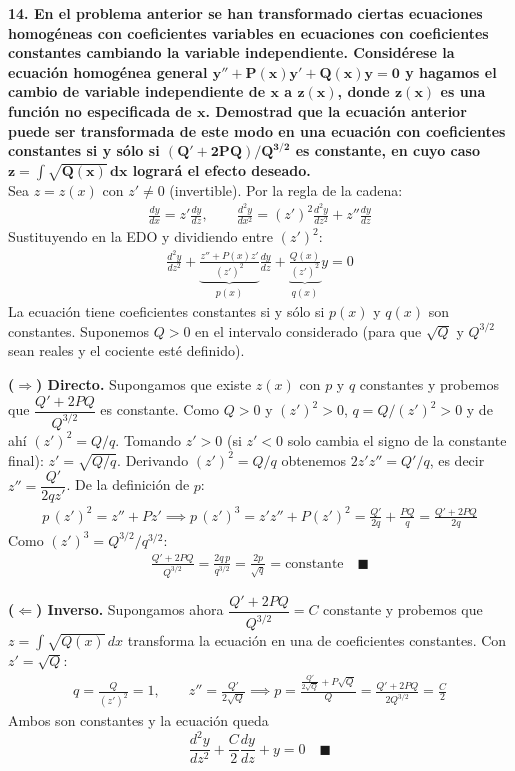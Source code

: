 \documentclass[11pt, a4paper]{article}
\begin{document}
\noindent\textbf{14. En el problema anterior se han transformado ciertas ecuaciones homogéneas con coeficientes variables en ecuaciones con coeficientes constantes cambiando la variable independiente. Considérese la ecuación homogénea general $\bm{y''+P(x)y'+Q(x)y=0}$ y hagamos el cambio de variable independiente de $\bm{x}$ a $\bm{z(x)}$, donde $\bm{z(x)}$ es una función no especificada de $\bm{x}$. Demostrad que la ecuación anterior puede ser transformada de este modo en una ecuación con coeficientes constantes si y sólo si $\bm{(Q'+2PQ)/Q^{3/2}}$ es constante, en cuyo caso $\bm{z=\int\sqrt{Q(x)}\,dx}$ logrará el efecto deseado.} \\
Sea $z=z(x)$ con $z'\neq0$ (invertible). Por la regla de la cadena:
\begin{align*}
\frac{dy}{dx} = z' \frac{dy}{dz}, \qquad \frac{d^2y}{dx^2} = (z')^2 \frac{d^2y}{dz^2} + z'' \frac{dy}{dz}
\end{align*}
Sustituyendo en la EDO y dividiendo entre $(z')^2$:
\begin{align*}
\frac{d^2y}{dz^2} + \underbrace{\frac{z'' + P(x)z'}{(z')^2}}_{p(x)} \frac{dy}{dz} + \underbrace{\frac{Q(x)}{(z')^2}}_{q(x)} y = 0
\end{align*}
La ecuación tiene coeficientes constantes si y sólo si $p(x)$ y $q(x)$ son constantes. Suponemos $Q>0$ en el intervalo considerado (para que $\sqrt{Q}$ y $Q^{3/2}$ sean reales y el cociente esté definido).

\vspace{0.2cm}\noindent\textbf{($\Rightarrow$) Directo.} Supongamos que existe $z(x)$ con $p$ y $q$ constantes y probemos que $\dfrac{Q'+2PQ}{Q^{3/2}}$ es constante. Como $Q>0$ y $(z')^2>0$, $q=Q/(z')^2>0$ y de ahí $(z')^2=Q/q$. Tomando $z'>0$ (si $z'<0$ solo cambia el signo de la constante final): $z'=\sqrt{Q/q}$. Derivando $(z')^2=Q/q$ obtenemos $2z'z''=Q'/q$, es decir $z''=\dfrac{Q'}{2qz'}$. De la definición de $p$:
\begin{align*}
p\,(z')^2 = z''+Pz' \implies p\,(z')^3 = z'z''+P(z')^2 = \frac{Q'}{2q} + \frac{PQ}{q} = \frac{Q'+2PQ}{2q}
\end{align*}
Como $(z')^3 = Q^{3/2}/q^{3/2}$:
\begin{align*}
\frac{Q'+2PQ}{Q^{3/2}} = \frac{2q\,p}{q^{3/2}} = \frac{2p}{\sqrt{q}} = \text{constante} \quad \blacksquare
\end{align*}

\vspace{0.2cm}\noindent\textbf{($\Leftarrow$) Inverso.} Supongamos ahora $\dfrac{Q'+2PQ}{Q^{3/2}}=C$ constante y probemos que $z=\int\sqrt{Q(x)}\,dx$ transforma la ecuación en una de coeficientes constantes. Con $z'=\sqrt{Q}$:
\begin{align*}
q = \frac{Q}{(z')^2} = 1, \qquad z'' = \frac{Q'}{2\sqrt{Q}} \implies p = \frac{\frac{Q'}{2\sqrt{Q}} + P\sqrt{Q}}{Q} = \frac{Q'+2PQ}{2Q^{3/2}} = \frac{C}{2}
\end{align*}
Ambos son constantes y la ecuación queda
\[
\frac{d^2y}{dz^2} + \frac{C}{2}\frac{dy}{dz} + y = 0 \quad \blacksquare
\]
\end{document}
